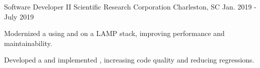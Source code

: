 \begin{cventries}
  \cventry
    {Software Developer II} %
    {Scientific Research Corporation} %
    {Charleston, SC} %
    {Jan. 2019 - July 2019} %
    {
      \begin{cvitems} %
        \item {Modernized a  using  and  on a LAMP stack, improving performance and maintainability.}
        \item {Developed a  and implemented , increasing code quality and reducing regressions.}
      \end{cvitems}
    }


\end{cventries}

